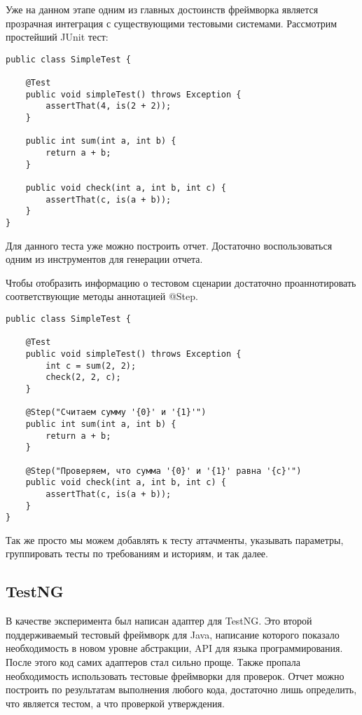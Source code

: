 Уже на данном этапе одним из главных достоинств фреймворка является прозрачная интеграция с существующими тестовыми системами. Рассмотрим простейший JUnit тест:
 
\begin{lstlisting}[caption=Простой JUnit тест.]
public class SimpleTest {

    @Test
    public void simpleTest() throws Exception {
        assertThat(4, is(2 + 2));
    }
    
    public int sum(int a, int b) {
		return a + b;
	}    
    
    public void check(int a, int b, int c) {
    	assertThat(c, is(a + b));	
    }
}
\end{lstlisting}

Для данного теста уже можно построить отчет. Достаточно воспользоваться одним из инструментов для генерации отчета.

Чтобы отобразить информацию о тестовом сценарии достаточно проаннотировать соответствующие методы аннотацией @Step.

\begin{lstlisting}[caption=Простой JUnit тест с добавлением шагов.]
public class SimpleTest {

    @Test
    public void simpleTest() throws Exception {
        int c = sum(2, 2);
        check(2, 2, c);
    }
    
    @Step("Считаем сумму '{0}' и '{1}'")
    public int sum(int a, int b) {
		return a + b;
	}    
    
    @Step("Проверяем, что сумма '{0}' и '{1}' равна '{c}'")
    public void check(int a, int b, int c) {
    	assertThat(c, is(a + b));	
    }
}
\end{lstlisting}

Так же просто мы можем добавлять к тесту аттачменты, указывать параметры, группировать тесты по требованиям и историям, и так далее.

\subsection{TestNG}

В качестве эксперимента был написан адаптер для TestNG. Это второй поддерживаемый тестовый фреймворк для Java, написание которого показало необходимость в новом уровне абстракции, API для языка программирования. После этого код самих адаптеров стал сильно проще. Также пропала необходимость использовать тестовые фреймворки для проверок. Отчет можно построить по результатам выполнения любого кода, достаточно лишь определить, что является тестом, а что проверкой утверждения.

